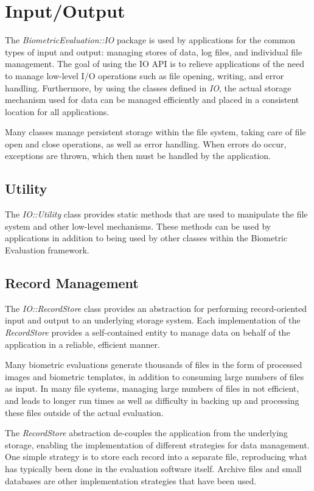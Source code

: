 %
%
\chapter{Input/Output}
\label{chp-io}

The {\em BiometricEvaluation::IO} package is used
by applications for the common types of input and output: managing stores of
data, log files, and individual file management. The goal of using the IO API 
is to relieve applications of the need to manage low-level I/O operations such
as file opening, writing, and error handling. Furthermore, by using the classes
defined in {\em IO}, the actual storage mechanism used for data can be managed 
efficiently and placed in a consistent location for all applications.

Many classes manage persistent storage within the file system,
taking care of file open and close operations, as well as error handling. When
errors do occur, exceptions are thrown, which then must be handled by the
application.

\section{Utility}

The {\em IO::Utility} class provides static methods that are used to
manipulate the file system and other low-level mechanisms. These methods
can be used by applications in addition to being used by other classes 
within the Biometric Evaluation framework.

\section{Record Management}

The {\em IO::RecordStore} class provides an abstraction for performing
record-oriented input and output to an underlying storage system. Each
implementation of the {\em RecordStore} provides a self-contained entity to
manage data on behalf of the application in a reliable, efficient manner.

Many biometric evaluations generate thousands of files in the form of processed
images and biometric templates, in addition to consuming large numbers of files
as input. In many file systems, managing large numbers of files in not
efficient, and leads to longer run times as well as difficulty in backing up
and processing these files outside of the actual evaluation.

The {\em RecordStore} abstraction de-couples the application from
the underlying storage, enabling the implementation of different strategies for
data management. One simple strategy is to store each record into a separate
file, reproducing what has typically been done in the evaluation software
itself. Archive files and small databases are other implementation strategies
that have been used.


